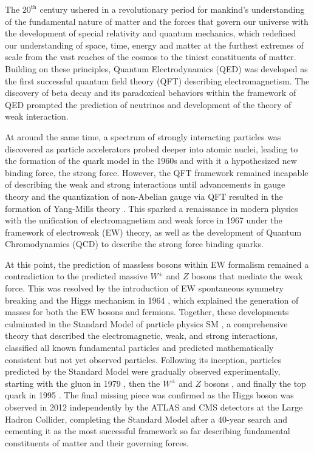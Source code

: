 \documentclass[../thesis.tex]{subfiles}
\begin{document}
\vspace{-1\baselineskip}

The $20^\text{th}$ century ushered in a revolutionary period for mankind's understanding of the fundamental nature of matter and the forces that govern our universe with the development of special relativity and quantum mechanics, which redefined our understanding of space, time, energy and matter at the furthest extremes of scale from the vast reaches of the cosmos to the tiniest constituents of matter. Building on these principles, Quantum Electrodynamics (QED) \citep{intro:sm} was developed as the first successful quantum field theory (\acs{QFT}) describing electromagnetism. The discovery of beta decay and its paradoxical behaviors within the framework of \acs{QED} prompted the prediction of neutrinos and development of the theory of weak interaction.

At around the same time, a spectrum of strongly interacting particles was discovered \citep{intro:griffiths} as particle accelerators probed deeper into atomic nuclei, leading to the formation of the quark model in the 1960s and with it a hypothesized new binding force, the strong force. However, the \acs{QFT} framework remained incapable of describing the weak and strong interactions until advancements in gauge theory and the quantization of non-Abelian gauge via \acs{QFT} resulted in the formation of Yang-Mills theory \citep{theory:yangmills,theory:yangmills2}. This sparked a renaissance in modern physics with the unification of electromagnetism and weak force in 1967 under the framework of electroweak (\acs{EW}) theory, as well as the development of Quantum Chromodynamics (\acs{QCD}) to describe the strong force binding quarks.

At this point, the prediction of massless bosons within \acs{EW} formalism remained a contradiction to the predicted massive $W^\pm$ and $Z$ bosons that mediate the weak force. This was resolved by the introduction of \acs{EW} spontaneous symmetry breaking and the Higgs mechanism in 1964 \citep{theory:higgs1,theory:higgs2,theory:brout_englert}, which explained the generation of masses for both the \acs{EW} bosons and fermions. Together, these developments culminated in the Standard Model of particle physics \acs{SM} \citep{intro:sm}, a comprehensive theory that described the electromagnetic, weak, and strong interactions, classified all known fundamental particles and predicted mathematically consistent but not yet observed particles. Following its inception, particles predicted by the Standard Model were gradually observed experimentally, starting with the gluon in 1979 \citep{intro:gluon}, then the $W^\pm$ and $Z$ bosons \citep{intro:W_obs,intro:Z_obs}, and finally the top quark in 1995 \citep{intro:top_cdf,intro:top_d0}. The final missing piece was confirmed as the Higgs boson was observed in 2012 independently by the \acs{ATLAS} \citep{theory:higgs_atlas} and \acs{CMS} \citep{theory:higgs_cms} detectors at the Large Hadron Collider, completing the Standard Model after a 40-year search and cementing it as the most successful framework so far describing fundamental constituents of matter and their governing forces.
\end{document}
